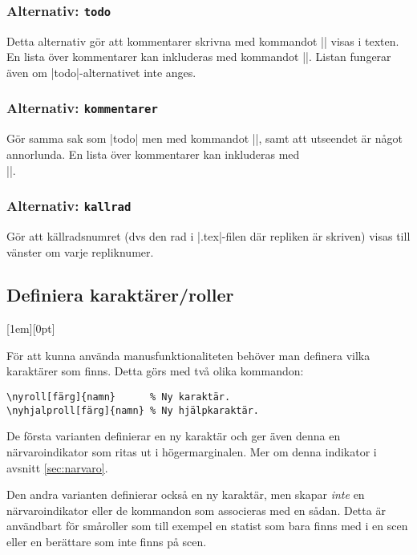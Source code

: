 \documentclass[a4paper,12pt]{article}
\newcommand\funnybone[1]{%
	\raisebox{1em}[1em][0pt]{%
		\makebox[\textwidth][r]{\large\it eller, ``#1''}%
	}%
}
\begin{document}
\subsubsection{Alternativ: \texttt{todo}}
\label{alt:todo}
Detta alternativ gör att kommentarer skrivna med kommandot || visas i texten. En lista över kommentarer kan inkluderas med kommandot |\todolista|. Listan fungerar även om |todo|-alternativet inte anges.

\subsubsection{Alternativ: \texttt{kommentarer}}
\label{alt:kommentarer}
Gör samma sak som |todo| men med kommandot |\kommentar|, samt att utseendet är något annorlunda. En lista över kommentarer kan inkluderas med \\|\kommentarlista|.

\subsubsection{Alternativ: \texttt{kallrad}}
\label{alt:kallrad}
Gör att källradsnumret (dvs den rad i |.tex|-filen där repliken är skriven) visas till vänster om varje repliknumer.

\subsection{Definiera karaktärer/roller}
\label{sec:nyroll}
\funnybone{Våra tävlande är...}
För att kunna använda manusfunktionaliteten behöver man definera vilka karaktärer som finns. Detta görs med två olika kommandon:

\begin{lstlisting}
\nyroll[färg]{namn}      % Ny karaktär.
\nyhjalproll[färg]{namn} % Ny hjälpkaraktär.
\end{lstlisting}

De första varianten definierar en ny karaktär och ger även denna en närvaroindikator som ritas ut i högermarginalen. Mer om denna indikator i avsnitt \ref{sec:narvaro}.

Den andra varianten definierar också en ny karaktär, men skapar \emph{inte} en närvaroindikator eller de kommandon som associeras med en sådan. Detta är användbart för småroller som till exempel en statist som bara finns med i en scen eller en berättare som inte finns på scen.
\end{document}
